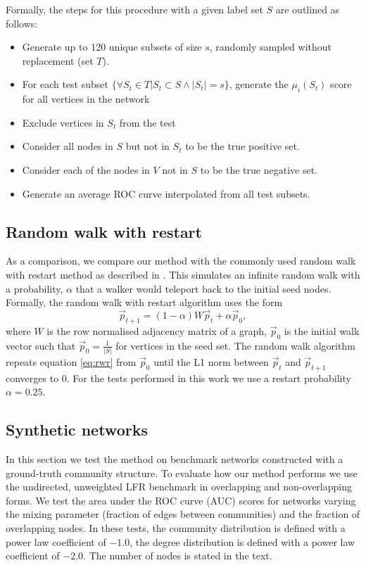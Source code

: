 \documentclass[sigconf]{acmart}
\begin{document}
Formally, the steps for this procedure with a given label set $S$ are outlined as follows:
\begin{itemize}
 \item Generate up to 120 unique subsets of size $s$, randomly sampled without replacement (set $T$).
 \item For each test subset $\{\forall S_t \in T | S_t \subset S \wedge |S_t| = s \}$, generate the $\mu_i(S_t)$ score for all vertices in the network
 \item Exclude vertices in $S_t$ from the test
 \item Consider all nodes in $S$ but not in $S_t$ to be the true positive set.
 \item Consider each of the nodes in $V$ not in $S$ to be the true negative set.
 \item Generate an average ROC curve interpolated from all test subsets.
 \end{itemize}

\subsection{Random walk with restart}
As a comparison, we compare our method with the commonly used random walk with restart method as described in \cite{kohler2008walking}.
This simulates an infinite random walk with a probability, $\alpha$ that a walker would teleport back to the initial seed nodes. 
Formally, the random walk with restart algorithm uses the form
\begin{equation} \label{eq:rwr}
 \vec{p}_{t+1} = (1 - \alpha) W \vec{p}_t + \alpha \vec{p}_0,
\end{equation}
where $W$ is the row normalised adjacency matrix of a graph, $\vec{p}_0$ is the initial walk vector such that $\vec{p}_0 = \frac{1}{|S|}$ for vertices in the seed set.
The random walk algorithm repeats equation \ref{eq:rwr} from $\vec{p}_0$ until the L1 norm between  $\vec{p}_t$ and  $\vec{p}_{t+1}$ converges to 0.
For the tests performed in this work we use a restart probability $\alpha = 0.25$.

\subsection{Synthetic networks}
In this section we test the method on benchmark networks constructed with a ground-truth community structure.
To evaluate how our method performs we use the undirected, unweighted LFR benchmark \cite{lancichinetti2008benchmark} in overlapping and non-overlapping forms.
We test the area under the ROC curve (AUC) scores for networks varying the mixing parameter (fraction of edges between communities) and the fraction of overlapping nodes.
In these tests, the community distribution is defined with a power law coefficient of $-1.0$, the degree distribution is defined with a power law coefficient of $-2.0$.
The number of nodes is stated in the text.
\end{document}
